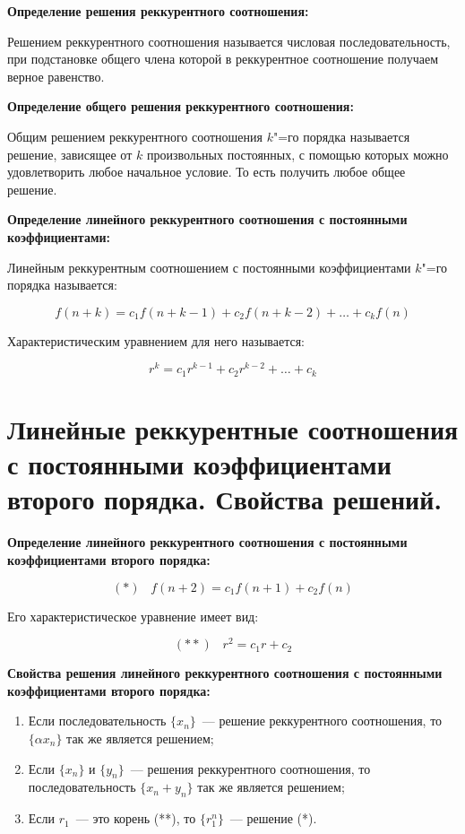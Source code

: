 \textbf{Определение решения реккурентного соотношения:}
    \smallskip
    
    Решением реккурентного соотношения называется числовая последовательность,
    при подстановке общего члена которой в реккурентное соотношение получаем
    верное равенство.
    \bigskip

\textbf{Определение общего решения реккурентного соотношения:}
    \smallskip
    
    Общим решением реккурентного соотношения $k$"=го порядка называется
    решение, зависящее от $k$ произвольных постоянных, с помощью которых можно удовлетворить
    любое начальное условие. То есть получить любое общее решение.
    \bigskip

\textbf{Определение линейного реккурентного соотношения с постоянными
коэффициентами:}
    \smallskip
    
    Линейным реккурентным соотношением с постоянными коэффициентами $k$"=го порядка
    называется:
    \smallskip
    
    \[
        f(n + k) = c_1 f(n + k - 1) + c_2 f(n + k - 2) + \dots + c_k f(n)  
    \]
    \smallskip

    Характеристическим уравнением для него называется:
    \smallskip

    \[
        r^k = c_1 r^{k - 1} + c_2 r^{k - 2} + \dots + c_k  
    \]

\section{Линейные реккурентные соотношения с постоянными коэффициентами
второго порядка. Свойства решений.}

\textbf{Определение линейного реккурентного соотношения с постоянными коэффициентами
второго порядка:}
    \smallskip

    \[
        (*) \;\;\; f(n + 2) = c_1 f(n + 1) + c_2 f(n)   
    \]
    \smallskip

    Его характеристическое уравнение имеет вид:
    \smallskip

    \[
       (**) \;\;\; r^2 = c_1 r + c_2  
    \]
    \bigskip

\textbf{Свойства решения линейного реккурентного соотношения с постоянными
коэффициентами второго порядка:}
    \smallskip
    
    \begin{enumerate}
        \item{Если последовательность $\{x_n\}$~--- решение реккурентного соотношения,
        то $\{\alpha x_n\}$ так же является решением;}
        \item{Если $\{x_n\}$ и $\{y_n\}$~--- решения реккурентного соотношения,
        то последовательность $\{x_n + y_n\}$ так же является решением;}
        \item{Если $r_1$~--- это корень (**), то $\{r_1^n\}$~--- решение (*).}
    \end{enumerate}


